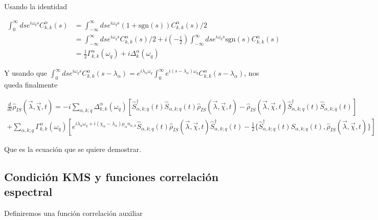 \begin{appendixs}
Usando la identidad 

\begin{align*}
    \int_{0}^{\infty}ds e^{i\omega_{q}s}C^{\alpha}_{k,k}(s) & = \int_{-\infty}^{\infty}ds e^{i\omega_{q}s}(1+\text{sgn}(s))C^{\alpha}_{k,k}(s)/2 \\
    & = \int_{-\infty}^{\infty}ds e^{i\omega_{q}s}C^{\alpha}_{k,k}(s)/2 + i \left(-\frac{i}{2} \right) \int_{-\infty}^{\infty}ds e^{i\omega_{q}s} \text{sgn}(s)C^{\alpha}_{k,k}(s) \\
    & = \frac{1}{2}\Gamma_{k,k}^{\alpha}(\omega_{q}) + i \Delta^{\alpha}_{k}(\omega_{q})
\end{align*}

Y usando que $\int_{0}^{\infty}dse^{i\omega_{q}s}C^{\alpha}_{k,k}(s-\lambda_{\alpha}) = e^{i\lambda_{\alpha}\omega_{q}}\int_{0}^{\infty}e^{i(s-\lambda_{\alpha})\omega_{q}}C^{\alpha}_{k,k}(s-\lambda_{\alpha}) $, nos queda finalmente

\begin{multline*}
    \frac{d}{dt}\hat{\rho}_{IS}(\vec{\lambda},\vec{\chi},t) = - i \sum_{\alpha,k;q}\Delta^{\alpha}_{k,k}(\omega_{q})\left[\hat{S}^{\dagger}_{\alpha,k;q}(t)\hat{S}_{\alpha,k;q}(t)\hat{\rho}_{IS}(\vec{\lambda},\vec{\chi},t) - \hat{\rho}_{IS}(\vec{\lambda},\vec{\chi},t)\hat{S}^{\dagger}_{\alpha,k;q}(t)\hat{S}_{\alpha,k;q}(t) \right] \\
    + \sum_{\alpha,k;q} \Gamma_{k,k}^{\alpha}(\omega_{q})\left[ e^{i\lambda_{\alpha}\omega_{q}+ i(\chi_{\alpha} - \lambda_{\alpha})\mu_{\alpha}n_{\alpha,k}}\hat{S}_{\alpha,k;q}(t)\hat{\rho}_{IS}(\vec{\lambda},\vec{\chi},t)\hat{S}^{\dagger}_{\alpha,k;q}(t) - \frac{1}{2}\{\hat{S}^{\dagger}_{\alpha,k;q}(t)\hat{S}_{\alpha,k;q}(t),\hat{\rho}_{IS}(\vec{\lambda},\vec{\chi},t) \}     \right]
\end{multline*}

Que es la ecuación que se quiere demostrar.

\label{apendixGKLSgeneral}

\newpage


\subsection{Condición KMS y funciones correlación espectral}
Definiremos una función correlación auxiliar


\end{appendixs}
